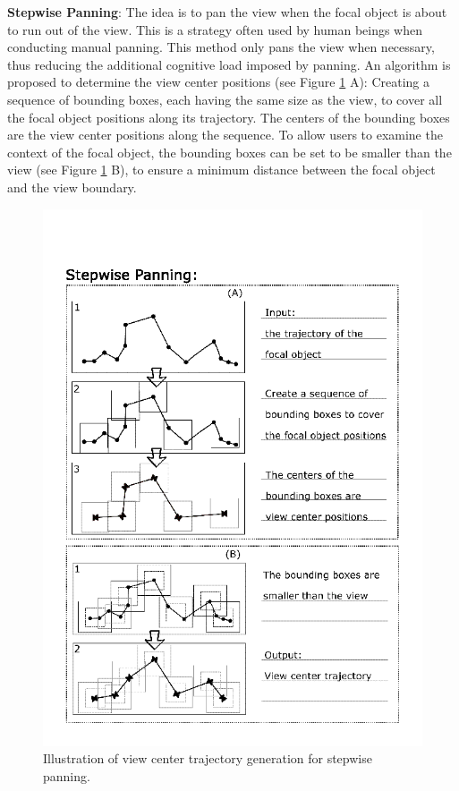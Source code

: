 \documentclass[review]{vgtc}                 %
\begin{document}
{\bf Stepwise Panning}: The idea is to pan the view when the focal object is about to run out of the view. This is a strategy often used by human beings when conducting manual panning. This method only pans the view when necessary, thus reducing the additional cognitive load imposed by panning. An algorithm is proposed to determine the view center positions (see Figure \ref{fig:stage} A): Creating a sequence of bounding boxes, each having the same size as the view, to cover all the focal object positions along its trajectory. The centers of the bounding boxes are the view center positions along the sequence. To allow users to examine the context of the focal object, the bounding boxes can be set to be smaller than the view (see Figure \ref{fig:stage} B), to ensure a minimum distance between the focal object and the view boundary.

\begin{figure}[t]
\centering
\includegraphics[width=\columnwidth]{stage}
\caption{Illustration of view center trajectory generation for stepwise panning.}
\label{fig:stage}
\end{figure}
\end{document}
